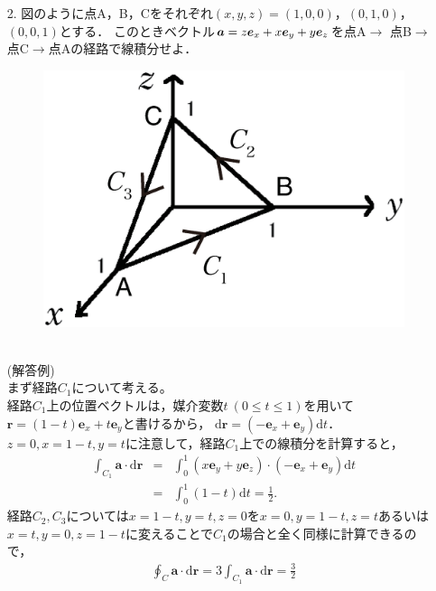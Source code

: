 \documentclass[11pt]{jarticle}
\def \vec#1{\mbox{\boldmath $#1$}} %
\begin{document}
\begin{enumerate}
\newpage
\item[2.]
図のように点A，B，Cをそれぞれ$\left(x, y, z \right)=\left(1, 0, 0 \right)$，$\left(0, 1, 0 \right)$，$\left(0, 0, 1 \right)$とする．
このときベクトル$\vec a=z \bm{e}_{x}+x \bm{e}_{y}+y \bm{e}_{z}$を点A$\rightarrow$
点B$\rightarrow$点C$\rightarrow$点Aの経路で線積分せよ．
\begin{figure}[h]
\begin{center}
\includegraphics[width=.4\textwidth
]{3men.eps}
\label{b}
\end{center}
\end{figure}
\\
(解答例)\\
まず経路$C_1$について考える。\\
経路$C_1$上の位置ベクトルは，媒介変数$t \ \left(0 \le t \le 1 \right)$を用いて$\bm{r}=(1-t)\bm{e}_{x}+t \bm{e}_{y}$と書けるから，
$\mathrm{d} \bm{r}=(-\bm{e}_{x}+\bm{e}_{y})\mathrm{d}t$．$z=0, x=1-t, y=t$に注意して，経路$C_1$上での線積分を計算すると，
%
\begin{eqnarray*}
\label{a}
\int_{C_1} \bm{a}\cdot \mathrm{d}\bm{r}&=&
\int_0^1 \left(x \bm{e}_y + y \bm{e}_z \right) \cdot \left(-\bm{e}_{x}+\bm{e}_{y} \right)\mathrm{d}t \\[8pt]
&=& \int^1_0 (1-t) \mathrm{d}t = \frac{1}{2}.
\end{eqnarray*}
経路$C_2, C_3$については$x=1-t, y=t, z=0$を$x=0, y=1-t, z=t$あるいは$x=t, y=0, z=1-t$に変えることで$C_1$の場合と全く同様に計算できるので，
\begin{eqnarray*}
\label{a}
\oint_C \bm{a} \cdot \mathrm{d}\bm{r}=3\int_{C_1} \bm{a}\cdot \mathrm{d}\bm{r}=\frac{3}{2}
\end{eqnarray*}

\end{enumerate}
\end{document}
